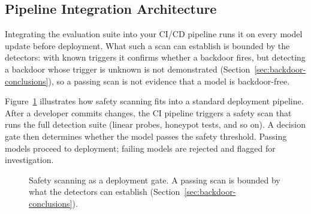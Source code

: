 \documentclass[11pt,letterpaper]{article}
\let\origsubsection\subsection
\renewcommand{\subsection}{\needspace{8\baselineskip}\origsubsection}}
\begin{document}
\subsection{Pipeline Integration Architecture}

Integrating the evaluation suite into your CI/CD pipeline runs it on every model update before deployment. What such a scan can establish is bounded by the detectors: with known triggers it confirms whether a backdoor fires, but detecting a backdoor whose trigger is unknown is not demonstrated (Section~\ref{sec:backdoor-conclusions}), so a passing scan is not evidence that a model is backdoor-free.

Figure~\ref{fig:cicd} illustrates how safety scanning fits into a standard deployment pipeline. After a developer commits changes, the CI pipeline triggers a safety scan that runs the full detection suite (linear probes, honeypot tests, and so on). A decision gate then determines whether the model passes the safety threshold. Passing models proceed to deployment; failing models are rejected and flagged for investigation.

\begin{figure}[!htbp]
\centering
{}
\caption{Safety scanning as a deployment gate. A passing scan is bounded by what the detectors can establish (Section~\ref{sec:backdoor-conclusions}).}
\label{fig:cicd}
\end{figure}
\end{document}
